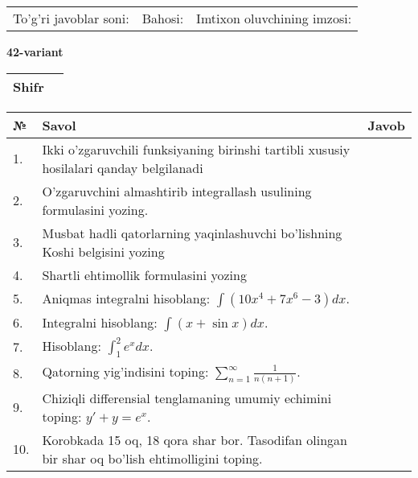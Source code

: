 \documentclass{article}
\begin{document}
  \vspace{1cm}
  
  \begin{tabular}{lll}
  To'g'ri javoblar soni: \underline{\hspace{1.5cm}} & 
  Bahosi: \underline{\hspace{1.5cm}} & 
  Imtixon oluvchining imzosi: \underline{\hspace{2cm}} \\
  \end{tabular}
  
  \egroup
  
  \newpage
  
  
  \textbf{42-variant}\\
  
  \bgroup
  \def\arraystretch{1.6} %
  
  \begin{tabular}{|m{5.7cm}|m{9.5cm}|}
  \hline
  Shifr & \\
  \hline
  \end{tabular}
  
  \vspace{1cm}
  
  \begin{tabular}{|m{0.7cm}|m{10cm}|m{4cm}|}
  \hline
  № & Savol & Javob \\
  \hline
  1. & Ikki o'zgaruvchili funksiyaning birinshi tartibli xususiy hosilalari qanday belgilanadi &  \\
  \hline
  2. & O'zgaruvchini almashtirib integrallash usulining formulasini yozing. &  \\
  \hline
  3. & Musbat hadli qatorlarning yaqinlashuvchi bo'lishning Koshi belgisini yozing &  \\
  \hline
  4. & Shartli ehtimollik formulasini yozing &  \\
  \hline
  5. & Aniqmas integralni hisoblang: \(\int {\left( 10x^{4} + 7x^{6} - 3 \right)dx}\). &  \\
  \hline
  6. & Integralni hisoblang: \(\int {(x + \sin x)dx}\). &  \\
  \hline
  7. & Hisoblang: \(\int_{1}^{2}{e^{x}dx}\). &  \\
  \hline
  8. & Qatorning yig'indisini toping: \(\sum_{n = 1}^{\infty}\frac{1}{n(n + 1)}\). &  \\
  \hline
  9. & Chiziqli differensial tenglamaning umumiy echimini toping: \(y' + y = e^{x}\). &  \\
  \hline
  10. & Korobkada 15 oq, 18 qora shar bor. Tasodifan olingan bir shar oq bo'lish ehtimolligini toping. &  \\
  \hline
  \end{tabular}
  
\end{document}

